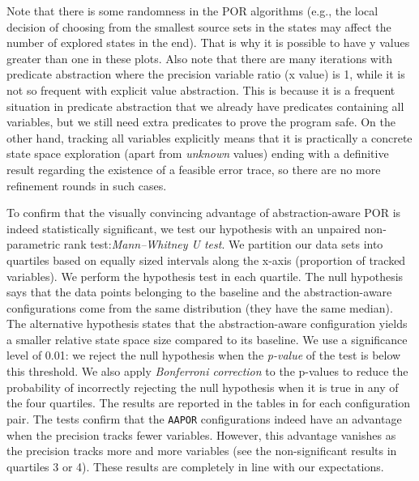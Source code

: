 \documentclass[numbook]{svjour3}
\begin{document}
\begin{description}
    Note that there is some randomness in the POR algorithms (e.g., the local decision of choosing from the smallest source sets in the states may affect the number of explored states in the end). That is why it is possible to have y values greater than one in these plots. Also note that there are many iterations with predicate abstraction where the precision variable ratio (x value) is 1, while it is not so frequent with explicit value abstraction. This is because it is a frequent situation in predicate abstraction that we already have predicates containing all variables, but we still need extra predicates to prove the program safe. On the other hand, tracking all variables explicitly means that it is practically a concrete state space exploration (apart from \emph{unknown} values) ending with a definitive result regarding the existence of a feasible error trace, so there are no more refinement rounds in such cases.

    To confirm that the visually convincing advantage of abstraction-aware POR is indeed statistically significant, we test our hypothesis with an unpaired non-parametric rank test:\emph{Mann--Whitney U test}. We partition our data sets into quartiles based on equally sized intervals along the x-axis (proportion of tracked variables). We perform the hypothesis test in each quartile. The null hypothesis says that the data points belonging to the baseline and the abstraction-aware configurations come from the same distribution (they have the same median). The alternative hypothesis states that the abstraction-aware configuration yields a smaller relative state space size compared to its baseline. We use a significance level of 0.01: we reject the null hypothesis when the \emph{p-value} of the test is below this threshold. We also apply \emph{Bonferroni correction} to the p-values to reduce the probability of incorrectly rejecting the null hypothesis when it is true in any of the four quartiles. The results are reported in the tables in  for each configuration pair. The tests confirm that the \texttt{AAPOR} configurations indeed have an advantage when the precision tracks fewer variables. However, this advantage vanishes as the precision tracks more and more variables (see the non-significant results in quartiles 3 or 4). These results are completely in line with our expectations.
    
	\item[\ref{rq:sv-benchmarks}]


\end{description}
\end{document}
